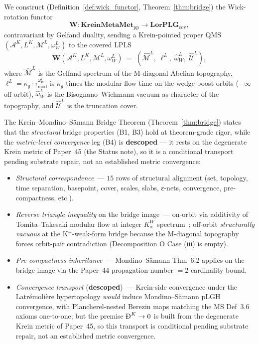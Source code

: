 \documentclass[11pt,a4paper]{article}
\theoremstyle{plain}
\theoremstyle{definition}
\newcommand{\Acal}{\mathcal{A}}
\newcommand{\Mcal}{\mathcal{M}}
\newcommand{\Ucal}{\mathcal{U}}
\newcommand{\BigDeth}{\text{\DJ}^{K}}
\newcommand{\Wfun}{\mathbf{W}}
\newcommand{\KreinMM}{\mathbf{KreinMetaMet}_{\mathrm{pp}}}
\newcommand{\LorPLG}{\mathbf{LorPLG}_{\mathrm{cov}}}
\newcommand{\BWvac}{\omega_{W}^{L}}
\newcommand{\Kalpha}{K_{\alpha}^{W}}
\newcommand{\tmod}{\tau_{\mathrm{mod}}}
\newcommand{\kappag}{\kappa_{g}}
\begin{document}
\medskip

We construct (Definition~\ref{def:wick_functor},
Theorem~\ref{thm:bridge}) the Wick-rotation functor
\[
\Wfun: \KreinMM \longrightarrow \LorPLG,
\]
contravariant by Gelfand duality, sending a Krein-pointed proper QMS
$(\Acal^{K}, L^{K}, \Mcal^{L}, \BWvac)$ to the covered LPLS
\[
\Wfun(\Acal^{K}, L^{K}, \Mcal^{L}, \BWvac)
\;=\; (\hat{\Mcal}^{L}, \;\ell^{L}, \;\hat{\omega}_{W}^{L}, \;\hat{\Ucal}^{L}),
\]
where $\hat{\Mcal}^{L}$ is the Gelfand spectrum of the M-diagonal
Abelian topography, $\ell^{L} = \kappag\cdot\tmod^{\BWvac}$ is
$\kappag$ times the modular-flow time on the wedge boost orbits
($-\infty$ off-orbit), $\hat{\omega}_{W}^{L}$ is the
Bisognano--Wichmann vacuum as character of the topography, and
$\hat{\Ucal}^{L}$ is the truncation cover.

The Krein--Mondino--S\"amann Bridge Theorem (Theorem~\ref{thm:bridge})
states that the \emph{structural} bridge properties (B1, B3) hold at
theorem-grade rigor, while the \emph{metric-level convergence} leg (B4)
is \textbf{descoped} --- it rests on the degenerate Krein metric of
Paper~45 (the Status note), so it is a conditional transport pending
substrate repair, not an established metric convergence:
\begin{itemize}
\item[(B1)] \emph{Structural correspondence}\ — $15$ rows of structural
alignment (set, topology, time separation, basepoint, cover, scales,
slabs, ε-nets, convergence, pre-compactness, etc.).
\item[(B2)] \emph{Reverse triangle inequality} on the bridge image\ —
on-orbit via additivity of Tomita--Takesaki modular flow at integer
$\Kalpha$ spectrum~\cite{paper42}; off-orbit \emph{structurally
vacuous} at the K$^{+}$-weak-form bridge because the M-diagonal
topography forces orbit-pair contradiction (Decomposition O Case (iii)
is empty).
\item[(B3)] \emph{Pre-compactness inheritance}\ — Mondino--S\"amann
Thm~6.2 applies on the bridge image via the Paper~44 propagation-number
$=2$ cardinality bound.
\item[(B4)] \emph{Convergence transport} (\textbf{descoped})\ — Krein-side
convergence under the Latr\'emoli\`ere hypertopology \emph{would} induce
Mondino--S\"amann pLGH convergence, with Plancherel-nested Berezin maps
matching the MS Def~3.6 axioms one-to-one; but the premise $\BigDeth\to0$
is built from the degenerate Krein metric of Paper~45, so this transport
is conditional pending substrate repair, not an established metric
convergence.
\end{itemize}
\end{document}
